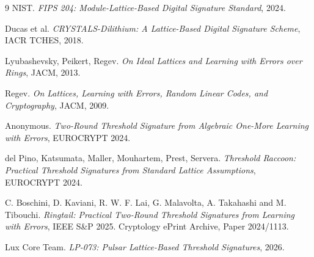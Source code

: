\documentclass[11pt,a4paper]{article}
\begin{document}

\begin{thebibliography}{9}
  NIST. \emph{FIPS 204: Module-Lattice-Based Digital Signature Standard}, 2024.

  Ducas et al. \emph{CRYSTALS-Dilithium: A Lattice-Based Digital Signature Scheme},
  IACR TCHES, 2018.

  Lyubashevsky, Peikert, Regev. \emph{On Ideal Lattices and Learning with Errors
  over Rings}, JACM, 2013.

  Regev. \emph{On Lattices, Learning with Errors, Random Linear Codes, and
  Cryptography}, JACM, 2009.

  Anonymous. \emph{Two-Round Threshold Signature from Algebraic One-More
  Learning with Errors}, EUROCRYPT 2024.

  del Pino, Katsumata, Maller, Mouhartem, Prest, Servera. \emph{Threshold
  Raccoon: Practical Threshold Signatures from Standard Lattice Assumptions},
  EUROCRYPT 2024.

  C. Boschini, D. Kaviani, R. W. F. Lai, G. Malavolta, A. Takahashi and
  M. Tibouchi. \emph{Ringtail: Practical Two-Round Threshold Signatures
  from Learning with Errors}, IEEE S\&P 2025. Cryptology ePrint Archive,
  Paper 2024/1113.

  Lux Core Team. \emph{LP-073: Pulsar Lattice-Based Threshold Signatures}, 2026.
\end{thebibliography}
\end{document}
